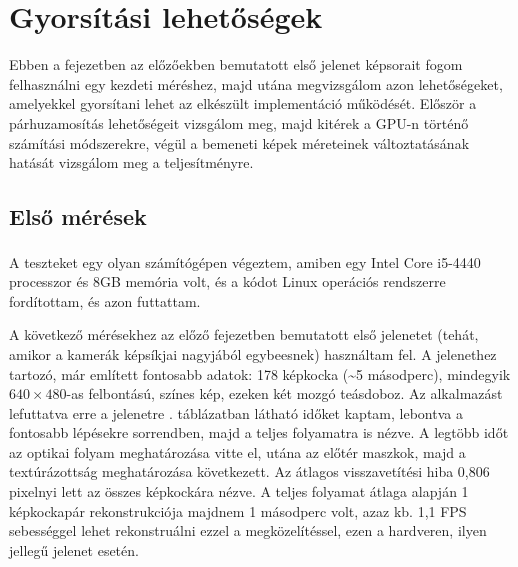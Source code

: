 \chapter{Gyorsítási lehetőségek}

Ebben a fejezetben az előzőekben bemutatott első jelenet képsorait fogom felhasználni egy kezdeti méréshez, majd utána megvizsgálom azon lehetőségeket, amelyekkel gyorsítani lehet az elkészült implementáció működését. Először a párhuzamosítás lehetőségeit vizsgálom meg, majd kitérek a GPU-n történő számítási módszerekre, végül a bemeneti képek méreteinek változtatásának hatását vizsgálom meg a teljesítményre.

\section{Első mérések}

A teszteket egy olyan számítógépen végeztem, amiben egy Intel\textsuperscript{\textregistered} Core\texttrademark{} i5-4440 processzor és 8GB memória volt, és a kódot Linux operációs rendszerre fordítottam, és azon futtattam.

A következő mérésekhez az előző fejezetben bemutatott első jelenetet (tehát, amikor a kamerák képsíkjai nagyjából egybeesnek) használtam fel. A jelenethez tartozó, már említett fontosabb adatok: 178 képkocka (\textasciitilde 5 másodperc), mindegyik $640\times 480$-as felbontású, színes kép, ezeken két mozgó teásdoboz. Az alkalmazást lefuttatva erre a jelenetre . táblázatban látható időket kaptam, lebontva a fontosabb lépésekre sorrendben, majd a teljes folyamatra is nézve. A legtöbb időt az optikai folyam meghatározása vitte el, utána az előtér maszkok, majd a textúrázottság meghatározása következett. Az átlagos visszavetítési hiba 0,806 pixelnyi lett az összes képkockára nézve. A teljes folyamat átlaga alapján 1 képkockapár rekonstrukciója majdnem 1 másodperc volt, azaz kb. 1,1 FPS sebességgel lehet rekonstruálni ezzel a megközelítéssel, ezen a hardveren, ilyen jellegű jelenet esetén.

